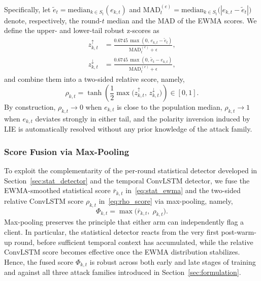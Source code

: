 \documentclass[journal]{IEEEtran}
\begin{document}
Specifically, let $\tilde{e}_t = \mathrm{median}_{k\in S_t}(e_{k,t})$ and $\mathrm{MAD}_t^{(e)} = \mathrm{median}_{k\in S_t}\bigl(|e_{k,t}-\tilde{e}_t|\bigr)$ denote, respectively, the round-$t$ median and the MAD of the EWMA scores. We define the upper- and lower-tail robust z-scores as
\begin{align}
z_{k,t}^{\uparrow} &= \frac{0.6745\,\max(0,\, e_{k,t}-\tilde{e}_t)}{\mathrm{MAD}_t^{(e)}+\epsilon}, \label{eq:z_up}\\
z_{k,t}^{\downarrow} &= \frac{0.6745\,\max(0,\, \tilde{e}_t-e_{k,t})}{\mathrm{MAD}_t^{(e)}+\epsilon}, \label{eq:z_down}
\end{align}
and combine them into a two-sided relative score, namely,
\begin{equation}
\rho_{k,t} = \tanh\!\left(\frac{1}{2}\max\!\bigl(z_{k,t}^{\uparrow},\, z_{k,t}^{\downarrow}\bigr)\right) \in [0,1].
\label{eq:rho_score}
\end{equation}
By construction, $\rho_{k,t} \to 0$ when $e_{k,t}$ is close to the population median, $\rho_{k,t} \to 1$ when $e_{k,t}$ deviates strongly in either tail, and the polarity inversion induced by LIE is automatically resolved without any prior knowledge of the attack family.

\subsubsection{Score Fusion via Max-Pooling}
To exploit the complementarity of the per-round statistical detector developed in Section~\ref{sec:stat_detector} and the temporal ConvLSTM detector, we fuse the EWMA-smoothed statistical score $\bar r_{k,t}$ in~\eqref{eq:stat_ewma} and the two-sided relative ConvLSTM score $\rho_{k,t}$ in~\eqref{eq:rho_score} via max-pooling, namely,
\begin{equation}
\Phi_{k,t} = \max\!\bigl(\bar r_{k,t},\; \rho_{k,t}\bigr).
\label{eq:fused_score}
\end{equation}
Max-pooling preserves the principle that either arm can independently flag a client. In particular, the statistical detector reacts from the very first post-warm-up round, before sufficient temporal context has accumulated, while the relative ConvLSTM score becomes effective once the EWMA distribution stabilizes. Hence, the fused score $\Phi_{k,t}$ is robust across both early and late stages of training and against all three attack families introduced in Section~\ref{sec:formulation}.
\end{document}
